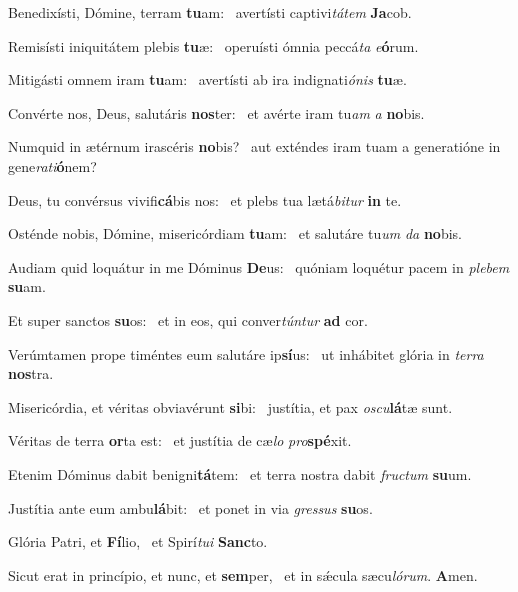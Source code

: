 \item Benedixísti, Dómine, terram \textbf{tu}am:~\psstar{} avertísti captivi\textit{tátem} \textbf{Ja}cob.
\item Remisísti iniquitátem plebis \textbf{tu}æ:~\psstar{} operuísti ómnia peccá\textit{ta} \textit{e}\textbf{ó}rum.
\item Mitigásti omnem iram \textbf{tu}am:~\psstar{} avertísti ab ira indignati\textit{ónis} \textbf{tu}æ.
\item Convérte nos, Deus, salutáris \textbf{nos}ter:~\psstar{} et avérte iram tu\textit{am} \textit{a} \textbf{no}bis.
\item Numquid in ætérnum irascéris \textbf{no}bis?~\psstar{} aut exténdes iram tuam a generatióne in gene\textit{rati}\textbf{ó}nem?
\item Deus, tu convérsus vivifi\textbf{cá}bis nos:~\psstar{} et plebs tua lætá\textit{bitur} \textbf{in} te.
\item Osténde nobis, Dómine, misericórdiam \textbf{tu}am:~\psstar{} et salutáre tu\textit{um} \textit{da} \textbf{no}bis.
\item Audiam quid loquátur in me Dóminus \textbf{De}us:~\psstar{} quóniam loquétur pacem in \textit{plebem} \textbf{su}am.
\item Et super sanctos \textbf{su}os:~\psstar{} et in eos, qui conver\textit{túntur} \textbf{ad} cor.
\item Verúmtamen prope timéntes eum salutáre ip\textbf{sí}us:~\psstar{} ut inhábitet glória in \textit{terra} \textbf{nos}tra.
\item Misericórdia, et véritas obviavérunt \textbf{si}bi:~\psstar{} justítia, et pax \textit{oscu}\textbf{lá}tæ sunt.
\item Véritas de terra \textbf{or}ta est:~\psstar{} et justítia de cæ\textit{lo} \textit{pro}\textbf{spé}xit.
\item Etenim Dóminus dabit benigni\textbf{tá}tem:~\psstar{} et terra nostra dabit \textit{fructum} \textbf{su}um.
\item Justítia ante eum ambu\textbf{lá}bit:~\psstar{} et ponet in via \textit{gressus} \textbf{su}os.
\item Glória Patri, et \textbf{Fí}lio,~\psstar{} et Spirí\textit{tui} \textbf{Sanc}to.
\item Sicut erat in princípio, et nunc, et \textbf{sem}per,~\psstar{} et in sǽcula sæcu\textit{lórum}. \textbf{A}men.

